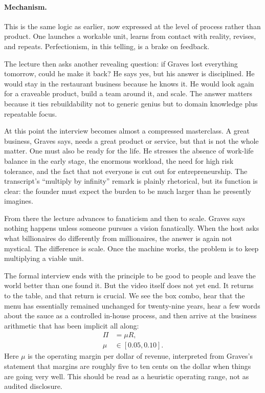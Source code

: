 \paragraph{Mechanism.}
This is the same logic as earlier, now expressed at the level of process rather than product. One launches a workable unit, learns from contact with reality, revises, and repeats. Perfectionism, in this telling, is a brake on feedback.

The lecture then asks another revealing question: if Graves lost everything tomorrow, could he make it back? He says yes, but his answer is disciplined. He would stay in the restaurant business because he knows it. He would look again for a craveable product, build a team around it, and scale. The answer matters because it ties rebuildability not to generic genius but to domain knowledge plus repeatable focus.

At this point the interview becomes almost a compressed masterclass. A great business, Graves says, needs a great product or service, but that is not the whole matter. One must also be ready for the life. He stresses the absence of work-life balance in the early stage, the enormous workload, the need for high risk tolerance, and the fact that not everyone is cut out for entrepreneurship. The transcript's ``multiply by infinity'' remark is plainly rhetorical, but its function is clear: the founder must expect the burden to be much larger than he presently imagines.

From there the lecture advances to fanaticism and then to scale. Graves says nothing happens unless someone pursues a vision fanatically. When the host asks what billionaires do differently from millionaires, the answer is again not mystical. The difference is scale. Once the machine works, the problem is to keep multiplying a viable unit.

The formal interview ends with the principle to be good to people and leave the world better than one found it. But the video itself does not yet end. It returns to the table, and that return is crucial. We see the box combo, hear that the menu has essentially remained unchanged for twenty-nine years, hear a few words about the sauce as a controlled in-house process, and then arrive at the business arithmetic that has been implicit all along:
\begin{align}
\Pi &= \mu R,\\
\mu &\in [0.05,0.10].
\end{align}
Here \(\mu\) is the operating margin per dollar of revenue, interpreted from Graves's statement that margins are roughly five to ten cents on the dollar when things are going very well. This should be read as a heuristic operating range, not as audited disclosure.

